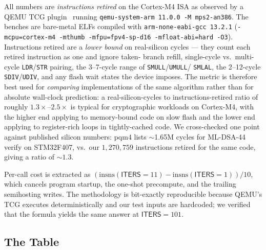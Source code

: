 \documentclass[11pt,a4paper]{article}
\begin{document}
All numbers are \emph{instructions retired} on the Cortex-M4 ISA as
observed by a QEMU TCG plugin~\cite{cyclebench-m4} running
\texttt{qemu-system-arm 11.0.0 -M mps2-an386}. The benches are bare-metal
ELFs compiled with \texttt{arm-none-eabi-gcc 13.2.1}
(\texttt{-mcpu=cortex-m4 -mthumb -mfpu=fpv4-sp-d16 -mfloat-abi=hard
-O3}). Instructions retired are a \emph{lower bound} on real-silicon
cycles --- they count each retired instruction as one and ignore taken-
branch refill, single-cycle vs.\ multi-cycle \texttt{LDR}/\texttt{STR}
pairing, the 3--7-cycle range of \texttt{SMULL}/\texttt{UMULL}/
\texttt{SMLAL}, the 2--12-cycle \texttt{SDIV}/\texttt{UDIV}, and any
flash wait states the device imposes. The metric is therefore best used
for \emph{comparing} implementations of the same algorithm rather than
for absolute wall-clock prediction: a real-silicon-cycles to
instructions-retired ratio of roughly $1.3\times$--$2.5\times$ is
typical for cryptographic workloads on Cortex-M4, with the higher end
applying to memory-bound code on slow flash and the lower end applying
to register-rich loops in tightly-cached code. We cross-checked one
point against published silicon numbers: pqm4 lists $\sim$1.65M cycles
for ML-DSA-44 verify on STM32F407, vs.\ our $1{,}270{,}759$
instructions retired for the same code, giving a ratio of $\sim$$1.3$.

Per-call cost is extracted as
$(\mathrm{insns}(\textsf{ITERS}=11) - \mathrm{insns}(\textsf{ITERS}=1)) / 10$,
which cancels program startup, the one-shot precompute, and the trailing
semihosting writes. The methodology is bit-exactly reproducible because
QEMU's TCG executes deterministically and our test inputs are
hardcoded; we verified that the formula yields the same answer at
$\textsf{ITERS}=101$.

\subsection{The Table}
\end{document}
